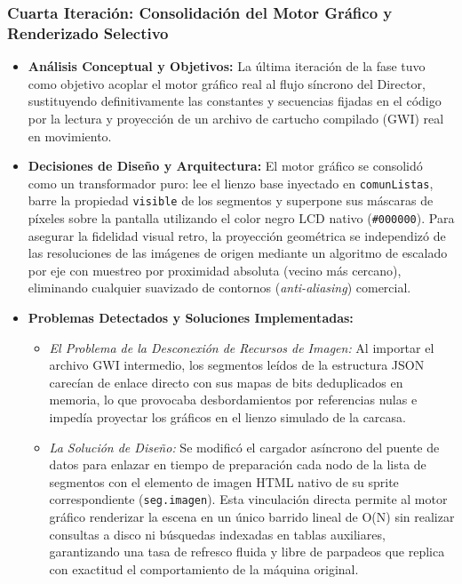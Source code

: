\subsubsection{Cuarta Iteración: Consolidación del Motor Gráfico y Renderizado Selectivo}
\begin{itemize}
	\item \textbf{Análisis Conceptual y Objetivos:} La última iteración de la fase tuvo como objetivo acoplar el motor gráfico real al flujo síncrono del Director, sustituyendo definitivamente las constantes y secuencias fijadas en el código por la lectura y proyección de un archivo de cartucho compilado (GWI) real en movimiento.
	\item \textbf{Decisiones de Diseño y Arquitectura:} El motor gráfico se consolidó como un transformador puro: lee el lienzo base inyectado en \texttt{comunListas}, barre la propiedad \texttt{visible} de los segmentos y superpone sus máscaras de píxeles sobre la pantalla utilizando el color negro LCD nativo (\texttt{\#000000}). Para asegurar la fidelidad visual retro, la proyección geométrica se independizó de las resoluciones de las imágenes de origen mediante un algoritmo de escalado por eje con muestreo por proximidad absoluta (vecino más cercano), eliminando cualquier suavizado de contornos (\textit{anti-aliasing}) comercial.
	\item \textbf{Problemas Detectados y Soluciones Implementadas:}
	\begin{itemize}
		\item \textit{El Problema de la Desconexión de Recursos de Imagen:} Al importar el archivo GWI intermedio, los segmentos leídos de la estructura JSON carecían de enlace directo con sus mapas de bits deduplicados en memoria, lo que provocaba desbordamientos por referencias nulas e impedía proyectar los gráficos en el lienzo simulado de la carcasa.
		\item \textit{La Solución de Diseño:} Se modificó el cargador asíncrono del puente de datos para enlazar en tiempo de preparación cada nodo de la lista de segmentos con el elemento de imagen HTML nativo de su sprite correspondiente (\texttt{seg.imagen}). Esta vinculación directa permite al motor gráfico renderizar la escena en un único barrido lineal de O(N) sin realizar consultas a disco ni búsquedas indexadas en tablas auxiliares, garantizando una tasa de refresco fluida y libre de parpadeos que replica con exactitud el comportamiento de la máquina original.
		\end{itemize}
	\end{itemize}
	
\clearpage